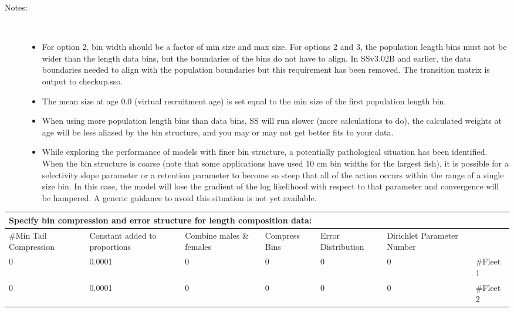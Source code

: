 \begin{description}
	\item[Notes:]\
	\begin{itemize}
		\item For option 2, bin width should be a factor of min size and max size.  For options 2 and 3, the population length bins must not be wider than the length data bins, but the boundaries of the bins do not have to align.  In SS\textunderscore v3.02B and earlier, the data boundaries needed to align with the population boundaries but this requirement has been removed.  The transition matrix is output to checkup.sso.
		\item The mean size at age 0.0 (virtual recruitment age) is set equal to the min size of the first population length bin.
		\item When using more population length bins than data bins, SS will run slower (more calculations to do), the calculated weights at age will be less aliased by the bin structure, and you may or may not get better fits to your data.
		\item While exploring the performance of models with finer bin structure, a potentially pathological situation has been identified.  When the bin structure is coarse (note that some applications have used 10 cm bin widths for the largest fish), it is possible for a selectivity slope parameter or a retention parameter to become so steep that all of the action occurs within the range of a single size bin.  In this case, the model will lose the gradient of the log likelihood with respect to that parameter and convergence will be hampered.  A generic guidance to avoid this situation is not yet available.
	\end{itemize}
\end{description}


\begin{center}
	\begin{tabular}{p{2cm} p{2cm} p{2cm} p{2cm} p{2cm} p{2cm} p{2cm}}
		\multicolumn{6}{l}{Specify bin compression and error structure for length composition data:}\\
		\hline
		\#Min Tail Compression & Constant added to proportions & Combine males \& females & Compress Bins & Error Distribution & Dirichlet Parameter Number & \\
		\hline
		0 & 0.0001 & 0 & 0 & 0 & 0 & \#Fleet 1\\
		0 & 0.0001 & 0 & 0 & 0 & 0 & \#Fleet 2\\
		\hline
	\end{tabular}
\end{center}

